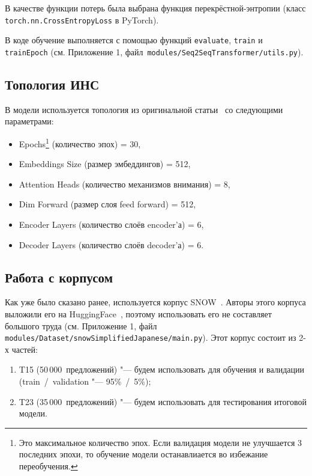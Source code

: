 В качестве функции потерь была выбрана функция перекрёстной-энтропии (класс \texttt{torch.nn.CrossEntropyLoss} в PyTorch).

В коде обучение выполняется с помощью функций \texttt{evaluate}, \texttt{train} и \texttt{trainEpoch} (см. Приложение 1, файл~\texttt{modules/Seq2SeqTransformer/utils.py}).


\subsection{Топология ИНС}


В модели используется топология из оригинальной статьи~\cite{vaswani2017attention} со следующими параметрами:
\begin{itemize}%
  \item Epochs\footnote{Это максимальное количество эпох. Если валидация модели не улучшается 3 последних эпохи, то обучение модели останавлиается во избежание переобучения.} (количество эпох) = 30,
  \item Embeddings Size (размер эмбеддингов) = 512,
  \item Attention Heads (количество механизмов внимания) = 8,
  \item Dim Forward (размер слоя feed forward) = 512,
  \item Encoder Layers (количество слоёв encoder'а) = 6,
  \item Decoder Layers (количество слоёв decoder'а) = 6.
\end{itemize}


\subsection{Работа с корпусом}


Как уже было сказано ранее, используется корпус SNOW~\cite{snow-dataset}.
Авторы этого корпуса выложили его на HuggingFace~\cite{HuggingFace}, поэтому использовать его не составляет большого труда (см. Приложение 1, файл \texttt{modules/Dataset/snowSimplifiedJapanese/main.py}).
Этот корпус состоит из 2-х частей:
\begin{enumerate}[1.]%
  \item T15 (50\,000~предложений) "--- будем использовать для обучения и валидации (train~/~validation "--- 95\%~/~5\%);
  \item T23 (35\,000~предложений) "--- будем использовать для тестирования итоговой модели.
\end{enumerate}


